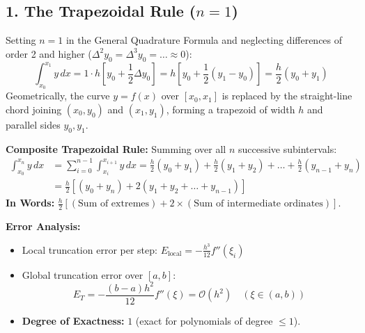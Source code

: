 \subsection{1. The Trapezoidal Rule \texorpdfstring{($n = 1$)}{(n = 1)}}
\begin{theorembox}
Setting $n = 1$ in the General Quadrature Formula and neglecting differences of order 2 and higher ($\Delta^2 y_0 = \Delta^3 y_0 = \dots \approx 0$):
\begin{equation}
    \int_{x_0}^{x_1} y \, dx = 1 \cdot h \left[ y_0 + \frac{1}{2}\Delta y_0 \right] = h \left[ y_0 + \frac{1}{2}(y_1 - y_0) \right] = \boxed{\frac{h}{2}(y_0 + y_1)}
\end{equation}
Geometrically, the curve $y = f(x)$ over $[x_0, x_1]$ is replaced by the straight-line chord joining $(x_0, y_0)$ and $(x_1, y_1)$, forming a trapezoid of width $h$ and parallel sides $y_0, y_1$.

\textbf{Composite Trapezoidal Rule:} Summing over all $n$ successive subintervals:
\begin{align}
    \int_{x_0}^{x_n} y \, dx &= \sum_{i=0}^{n-1} \int_{x_i}^{x_{i+1}} y \, dx = \frac{h}{2}(y_0 + y_1) + \frac{h}{2}(y_1 + y_2) + \dots + \frac{h}{2}(y_{n-1} + y_n) \nonumber \\
    &= \boxed{\frac{h}{2} \left[ (y_0 + y_n) + 2(y_1 + y_2 + \dots + y_{n-1}) \right]}
\end{align}
\textbf{In Words:} $\frac{h}{2} \left[ (\text{Sum of extremes}) + 2 \times (\text{Sum of intermediate ordinates}) \right]$.

\textbf{Error Analysis:}
\begin{itemize}[noitemsep]
    \item Local truncation error per step: $E_{\text{local}} = -\frac{h^3}{12} f''(\xi_i)$
    \item Global truncation error over $[a, b]$:
    \begin{equation}
        \boxed{E_T = -\frac{(b-a)h^2}{12} f''(\xi) = \mathcal{O}(h^2)} \quad (\xi \in (a, b))
    \end{equation}
    \item \textbf{Degree of Exactness:} $1$ (exact for polynomials of degree $\le 1$).
\end{itemize}
\end{theorembox}

